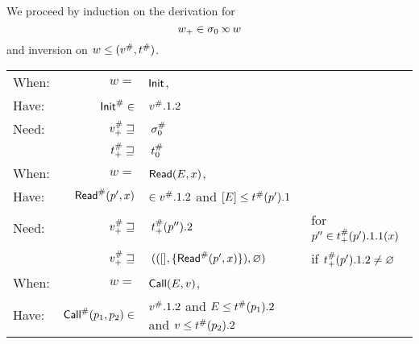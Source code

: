 We proceed by induction on the derivation for
\[w_+\in\ctx_0\semlink w\]
and inversion on $w\le({v}^{\#},{t}^{\#})$.
\begin{center}
  \begin{tabular}{|l@{\hskip2pt}r@{\hskip2pt}l@{\hskip2pt}l|}
    \hline
    When: & $w=$                                & $\textsf{Init}$,                                                                  &                                                              \\
    Have: & ${\textsf{Init}}^{\#}\in$                     & ${v}^{\#}.1.2$                                                              &                                                              \\
    Need: & ${v}^{\#}_+\sqsupseteq$              & $\:{\sigma}^{\#}_0$                                                             &                                                              \\
          & ${t}^{\#}_+\sqsupseteq$           & $\:{t}^{\#}_0$                                                           &                                                              \\
    \hline
    When: & $w=$                                & $\textsf{Read}(E,x)$,                                                        &                                                              \\
    Have: & ${\textsf{Read}}^{\#}(p',x)$                  & $\in{v}^{\#}.1.2$ and $[E]\le{t}^{\#}(p').1$                         &                                                              \\
    Need: & ${v}^{\#}_+\sqsupseteq$              & $\:{t}^{\#}_+(p'').2$                                                    & for $p''\in{t}^{\#}_+(p').1.1(x)$                          \\
          & ${v}^{\#}_+\sqsupseteq$              & $\:(([],\{{\textsf{Read}}^{\#}(p',x)\}),\varnothing)$                                & if ${t}^{\#}_+(p').1.2\neq\varnothing$                     \\
    \hline
    When: & $w=$                                & $\textsf{Call}(E,v)$,                                                        &                                                              \\
    Have: & ${\textsf{Call}}^{\#}(p_1,p_2)\in$            & ${v}^{\#}.1.2$ and $E\le{t}^{\#}(p_1).2$ and $v\le{t}^{\#}(p_2).2$ &                                                              \\

\end{tabular}
\end{center}
